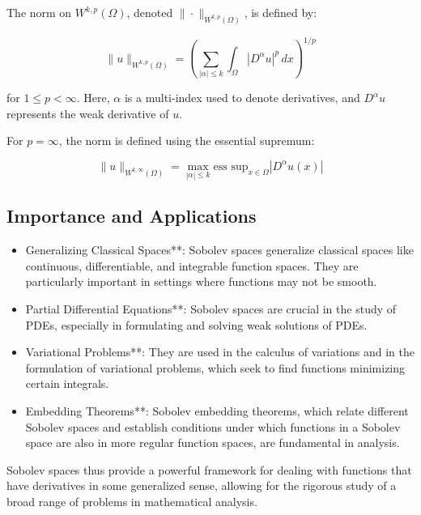 \documentclass[a4paper,12pt]{article} %
\begin{document}
The norm on $W^{k,p}(\Omega)$, denoted $\|\cdot\|_{W^{k,p}(\Omega)}$, is defined by:

\[
\|u\|_{W^{k,p}(\Omega)} = {\left( \sum_{|\alpha| \leq k} \int_{\Omega} |D^{\alpha} u|^p \, dx \right)}^{1/p}
\]

for $1 \leq p < \infty$. Here, $\alpha$ is a multi-index used to denote derivatives, and $D^{\alpha} u$ represents the weak derivative of $u$.

For $p = \infty$, the norm is defined using the essential supremum:

\[
\|u\|_{W^{k,\infty}(\Omega)} = \max_{|\alpha| \leq k} \text{ess sup}_{x \in \Omega} |D^{\alpha} u(x)|
\]

\subsection{Importance and Applications}
\begin{itemize}

   \item Generalizing Classical Spaces**: Sobolev spaces generalize classical spaces like continuous, differentiable, and integrable function spaces. They are particularly important in settings where functions may not be smooth.
  
   \item Partial Differential Equations**: Sobolev spaces are crucial in the study of PDEs, especially in formulating and solving weak solutions of PDEs.
  
   \item Variational Problems**: They are used in the calculus of variations and in the formulation of variational problems, which seek to find functions minimizing certain integrals.

   \item Embedding Theorems**: Sobolev embedding theorems, which relate different Sobolev spaces and establish conditions under which functions in a Sobolev space are also in more regular function spaces, are fundamental in analysis.

\end{itemize}
   Sobolev spaces thus provide a powerful framework for dealing with functions that have derivatives in some generalized sense, allowing for the rigorous study of a broad range of problems in mathematical analysis.
\end{document}
